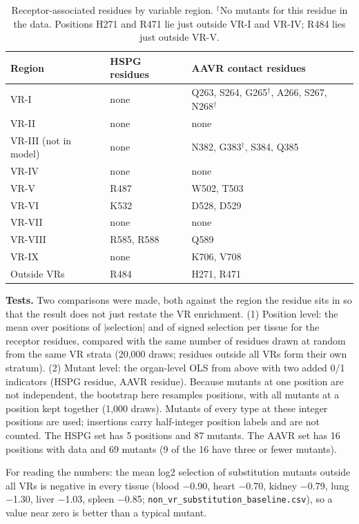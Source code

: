 \documentclass[11pt]{article}
\begin{document}
\begin{table}[H]
\centering
\caption{Receptor-associated residues by variable region. $^\dagger$No mutants for this residue
in the data. Positions H271 and R471 lie just outside VR-I and VR-IV; R484 lies just outside VR-V.}
\label{tab:rvmap}
\small
\begin{tabular}{lll}
\toprule
Region & HSPG residues & AAVR contact residues \\
\midrule
VR-I & none & Q263, S264, G265$^\dagger$, A266, S267, N268$^\dagger$ \\
VR-II & none & none \\
VR-III (not in model) & none & N382, G383$^\dagger$, S384, Q385 \\
VR-IV & none & none \\
VR-V & R487 & W502, T503 \\
VR-VI & K532 & D528, D529 \\
VR-VII & none & none \\
VR-VIII & R585, R588 & Q589 \\
VR-IX & none & K706, V708 \\
Outside VRs & R484 & H271, R471 \\
\bottomrule
\end{tabular}
\end{table}

\textbf{Tests.} Two comparisons were made, both against the region the residue sits in so that
the result does not just restate the VR enrichment. (1) Position level: the mean over positions
of $|$selection$|$ and of signed selection per tissue for the receptor residues, compared with
the same number of residues drawn at random from the same VR strata (20,000 draws; residues
outside all VRs form their own stratum). (2) Mutant level: the organ-level OLS from above with
two added 0/1 indicators (HSPG residue, AAVR residue). Because mutants at one position are not
independent, the bootstrap here resamples positions, with all mutants at a position kept
together (1,000 draws). Mutants of every type at these integer positions are used; insertions
carry half-integer position labels and are not counted. The HSPG set has 5 positions and 87
mutants. The AAVR set has 16 positions with data and 69 mutants (9 of the 16 have three or fewer
mutants).

For reading the numbers: the mean log2 selection of substitution mutants outside all VRs is
negative in every tissue (blood $-$0.90, heart $-$0.70, kidney $-$0.79, lung $-$1.30, liver
$-$1.03, spleen $-$0.85; \texttt{non\_vr\_substitution\_baseline.csv}), so a value near zero is
better than a typical mutant.
\end{document}
